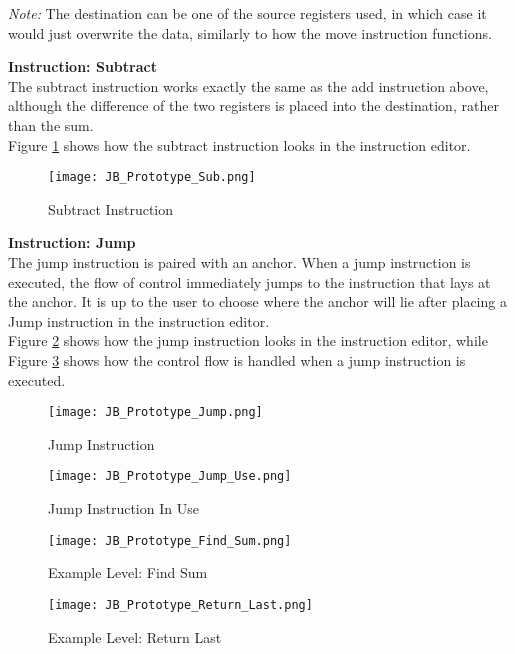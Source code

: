 \textit{Note:} The destination can be one of the source registers used, in which case it would
just overwrite the data, similarly to how the move instruction functions.\\
\newpage

\textbf{Instruction: Subtract}\\
The subtract instruction works exactly the same as the add instruction above,
although the difference of the two registers is placed into the destination, rather
than the sum.\\

Figure \ref{fig:Sub_Instruction} shows how the subtract instruction looks in the
instruction editor.\\

\begin{figure}[!htb]
	\caption{Subtract Instruction}
	\label{fig:Sub_Instruction}
	\centering
	\texttt{[image: JB\_Prototype\_Sub.png]}
\end{figure}

\textbf{Instruction: Jump}\\
The jump instruction is paired with an anchor. When a jump instruction is executed,
the flow of control immediately jumps to the instruction that lays at the anchor. It is 
up to the user to choose where the anchor will lie after placing a Jump instruction
in the instruction editor.\\

Figure \ref{fig:Jump_Instruction} shows how the jump instruction looks in the
instruction editor, while Figure \ref{fig:Jump_Instruction_Use} shows how the control 
flow is handled when a jump instruction is executed.\\

\begin{figure}[!hb]
  \caption{Jump Instruction}
  \label{fig:Jump_Instruction}
  \centering
  \texttt{[image: JB\_Prototype\_Jump.png]}
\end{figure}

\begin{figure}[!hb]
  \caption{Jump Instruction In Use}
  \label{fig:Jump_Instruction_Use}
  \centering
  \texttt{[image: JB\_Prototype\_Jump\_Use.png]}
\end{figure}

\begin{figure}[!hb]
  \caption{Example Level: Find Sum}
  \label{fig:Find_Sum}
  \centering
  \texttt{[image: JB\_Prototype\_Find\_Sum.png]}
\end{figure}


\begin{figure}[!hb]
  \caption{Example Level: Return Last}
  \label{fig:Return_Last}
  \centering
  \texttt{[image: JB\_Prototype\_Return\_Last.png]}
\end{figure}
\vfill
\clearpage
